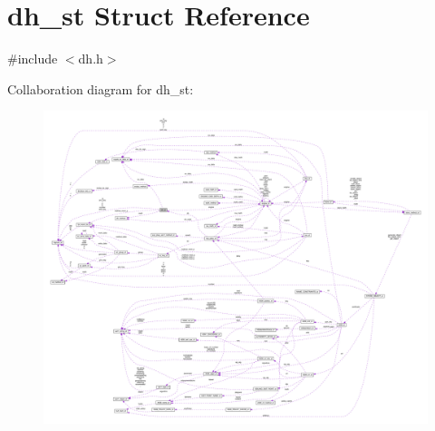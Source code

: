 \hypertarget{structdh__st}{}\section{dh\+\_\+st Struct Reference}
\label{structdh__st}


{\ttfamily \#include $<$dh.\+h$>$}



Collaboration diagram for dh\+\_\+st\+:\nopagebreak
\begin{figure}[H]
\begin{center}
\leavevmode
\includegraphics[width=350pt]{structdh__st__coll__graph}
\end{center}
\end{figure}
